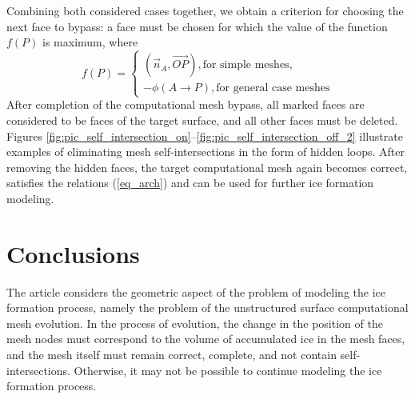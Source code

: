 \documentclass[
11pt,%
tightenlines,%
twoside,%
onecolumn,%
nofloats,%
nobibnotes,%
nofootinbib,%
superscriptaddress,%
noshowpacs,%
centertags]%
{revtex4-2}
\begin{document}
Combining both considered cases together, we obtain  a criterion for
choosing the next face to bypass: a face must be chosen for which
the value of the function $f(P)$ is maximum, where
\begin{equation}
f(P) =
\begin{cases}
(\vec{n}_A, \vec{OP}), \text{for simple meshes}, \\
-\phi(A \rightarrow P), \text{for general case meshes}
\end{cases}
\end{equation}
After completion of the computational mesh bypass, all marked faces are considered to be faces of the target surface, and all other faces must be deleted.
Figures
\ref{fig:pic_self_intersection_on}--\ref{fig:pic_self_intersection_off_2}
illustrate examples of eliminating mesh self-intersections in the
form of hidden loops.
After removing the hidden faces, the target computational mesh again becomes correct, satisfies the relations (\ref{eq_arch}) and can be used for further ice formation modeling.


\section{Conclusions}

The article considers the geometric aspect of the problem of modeling the ice formation process, namely the problem of the unstructured surface computational mesh evolution.
In the process of evolution, the change in the position of the mesh nodes must correspond to the volume of accumulated ice in the mesh faces, and the mesh itself must remain correct, complete, and not contain self-intersections.
Otherwise, it may not be possible to continue modeling the ice formation process.
\end{document}
